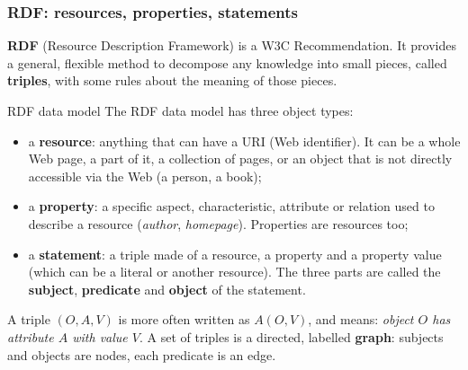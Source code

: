 \subsubsection{RDF: resources, properties, statements}

\textbf{RDF} (Resource Description Framework) is a W3C Recommendation. It provides a
general, flexible method to decompose any knowledge into small pieces, called
\textbf{triples}, with some rules about the meaning of those pieces.

\begin{nbdef}{RDF data model}
The RDF data model has three object types:
\begin{itemize}[nosep]
  \item a \textbf{resource}: anything that can have a URI (Web identifier). It can be a
        whole Web page, a part of it, a collection of pages, or an object that is not
        directly accessible via the Web (a person, a book);
  \item a \textbf{property}: a specific aspect, characteristic, attribute or relation
        used to describe a resource (\emph{author}, \emph{homepage}). Properties are
        resources too;
  \item a \textbf{statement}: a triple made of a resource, a property and a property
        value (which can be a literal or another resource). The three parts are called
        the \textbf{subject}, \textbf{predicate} and \textbf{object} of the statement.
\end{itemize}
\end{nbdef}

A triple $(O, A, V)$ is more often written as $A(O, V)$, and means: \emph{object $O$ has
attribute $A$ with value $V$}. A set of triples is a directed, labelled \textbf{graph}:
subjects and objects are nodes, each predicate is an edge.

\begin{center}
\label{fig:rdf-graph}
\end{center}

